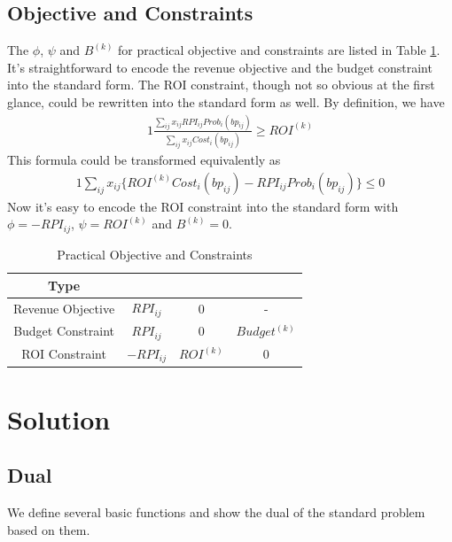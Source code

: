 \documentclass{article}
\newcommand{\sumij}{\sum\limits_{ij}}
\newcommand{\sx}{x_{ij}}
\newcommand{\sbp}{bp_{ij}}
\newcommand{\sumijx}[1]{\sumij\sx{}#1}
\newcommand{\sProb}{Prob_i(\sbp)}
\newcommand{\sCost}{Cost_i(\sbp)}
\newcommand{\sB}{B^{(k)}}
\newcommand{\sBudget}{Budget^{(k)}}
\newcommand{\sROI}{ROI^{(k)}}
\newcommand{\sCPI}{RPI_{ij}}
\newcommand{\sRevenuePforP}{\sumijx{\sCPI\sProb}}
\newcommand{\sBiddingCost}{\sumijx{\sCost}}
\newcommand{\pprob}{\phi}
\newcommand{\pcost}{\psi}
\begin{document}
\subsection{Objective and Constraints} \label{ObjectivesAndConstraints}


The $\pprob$, $\pcost$ and $\sB$ for practical objective and constraints are listed in Table \ref{TableObjectives}.
It's straightforward to encode the revenue objective and the budget constraint into the standard form.
The ROI constraint, though not so obvious at the first glance, could be rewritten into the standard form as well.
By definition, we have
\begin{alignat}{1}
\frac{\sRevenuePforP}{\sBiddingCost}\ge\sROI
\end{alignat}
This formula could be transformed equivalently as
\begin{alignat}{1}
\sumijx{\{\sROI\sCost-\sCPI\sProb\}}\le0
\end{alignat}
Now it's easy to encode the ROI constraint into the standard form with $\pprob=-\sCPI$, $\pcost=\sROI$ and $\sB=0$.

\begin{table}
\caption{Practical Objective and Constraints\label{TableObjectives}}
\begin{center}
\begin{tabular}{c|c|c|c}
\hline
\textbf{Type}      & \boldmath{$\pprob$} & \boldmath{$\pcost$}  & \boldmath{$\sB$} \\
\hline
\hline
Revenue Objective  & $\sCPI$             & $0$                  & - \\
Budget Constraint  & $\sCPI$             & $0$                  & $\sBudget$ \\
ROI Constraint     & $-\sCPI$            & $\sROI$              & $0$ \\
\hline
\end{tabular}
\end{center}
\end{table}

\section{Solution} \label{Solution}

\subsection{Dual}

We define several basic functions and show the dual of the standard problem based on them.
\end{document}
